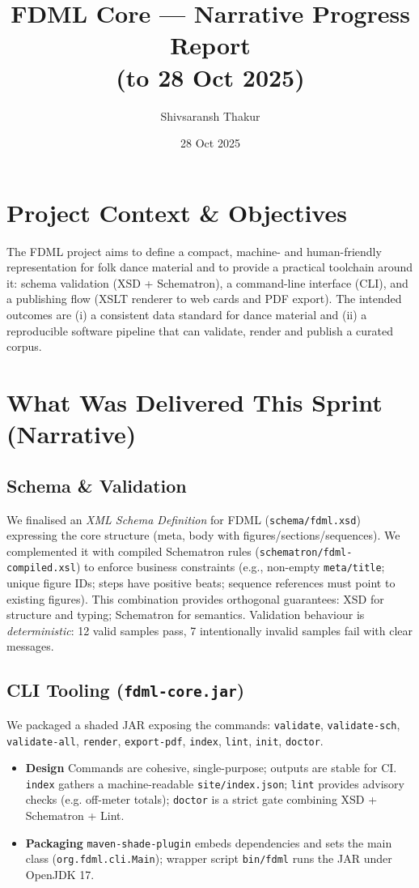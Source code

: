 \documentclass[11pt,a4paper]{article}
\title{\textbf{FDML Core — Narrative Progress Report}\\\large (to 28 Oct 2025)}
\author{Shivsaransh Thakur}
\date{28 Oct 2025}
\newcommand{\code}[1]{\texttt{#1}}
\newcommand{\smallsec}[1]{\textbf{#1}\quad}
\begin{document}
\maketitle

\section{Project Context \& Objectives}
The FDML project aims to define a compact, machine- and human-friendly representation for folk dance material and to provide a practical toolchain around it: schema validation (XSD + Schematron), a command-line interface (CLI), and a publishing flow (XSLT renderer to web cards and PDF export). The intended outcomes are (i) a consistent data standard for dance material and (ii) a reproducible software pipeline that can validate, render and publish a curated corpus.

\section{What Was Delivered This Sprint (Narrative)}
\subsection{Schema \& Validation}
We finalised an \emph{XML Schema Definition} for FDML (\code{schema/fdml.xsd}) expressing the core structure (meta, body with figures/sections/sequences). We complemented it with compiled Schematron rules (\code{schematron/fdml-compiled.xsl}) to enforce business constraints (e.g., non-empty \code{meta/title}; unique figure IDs; steps have positive beats; sequence references must point to existing figures). This combination provides orthogonal guarantees: XSD for structure and typing; Schematron for semantics. Validation behaviour is \emph{deterministic}: 12 valid samples pass, 7 intentionally invalid samples fail with clear messages.

\subsection{CLI Tooling (\code{fdml-core.jar})}
We packaged a shaded JAR exposing the commands: \code{validate}, \code{validate-sch}, \code{validate-all}, \code{render}, \code{export-pdf}, \code{index}, \code{lint}, \code{init}, \code{doctor}. 
\begin{itemize}[leftmargin=1.2em]
  \item \smallsec{Design} Commands are cohesive, single-purpose; outputs are stable for CI. \code{index} gathers a machine-readable \code{site/index.json}; \code{lint} provides advisory checks (e.g. off-meter totals); \code{doctor} is a strict gate combining XSD + Schematron + Lint.
  \item \smallsec{Packaging} \code{maven-shade-plugin} embeds dependencies and sets the main class (\code{org.fdml.cli.Main}); wrapper script \code{bin/fdml} runs the JAR under OpenJDK 17.
\end{itemize}
\end{document}
